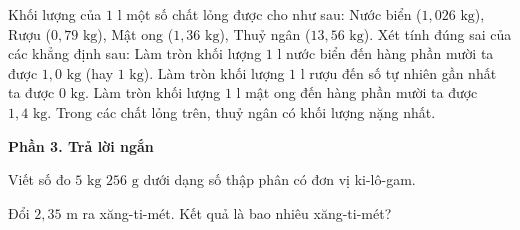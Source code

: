 \begin{ex} %
Khối lượng của $1\text{ l}$ một số chất lỏng được cho như sau: Nước biển ($1{,}026\text{ kg}$), Rượu ($0{,}79\text{ kg}$), Mật ong ($1{,}36\text{ kg}$), Thuỷ ngân ($13{,}56\text{ kg}$). Xét tính đúng sai của các khẳng định sau:
\choiceTF
{\True Làm tròn khối lượng $1\text{ l}$ nước biển đến hàng phần mười ta được $1{,}0\text{ kg}$ (hay $1\text{ kg}$).}
{Làm tròn khối lượng $1\text{ l}$ rượu đến số tự nhiên gần nhất ta được $0\text{ kg}$.}
{\True Làm tròn khối lượng $1\text{ l}$ mật ong đến hàng phần mười ta được $1{,}4\text{ kg}$.}
{\True Trong các chất lỏng trên, thuỷ ngân có khối lượng nặng nhất.}
\end{ex}

\textbf{Phần 3. Trả lời ngắn}

\begin{ex} %
Viết số đo $5\text{ kg } 256\text{ g}$ dưới dạng số thập phân có đơn vị ki-lô-gam.
\end{ex}

\begin{ex} %
Đổi $2{,}35\text{ m}$ ra xăng-ti-mét. Kết quả là bao nhiêu xăng-ti-mét?
\end{ex}

